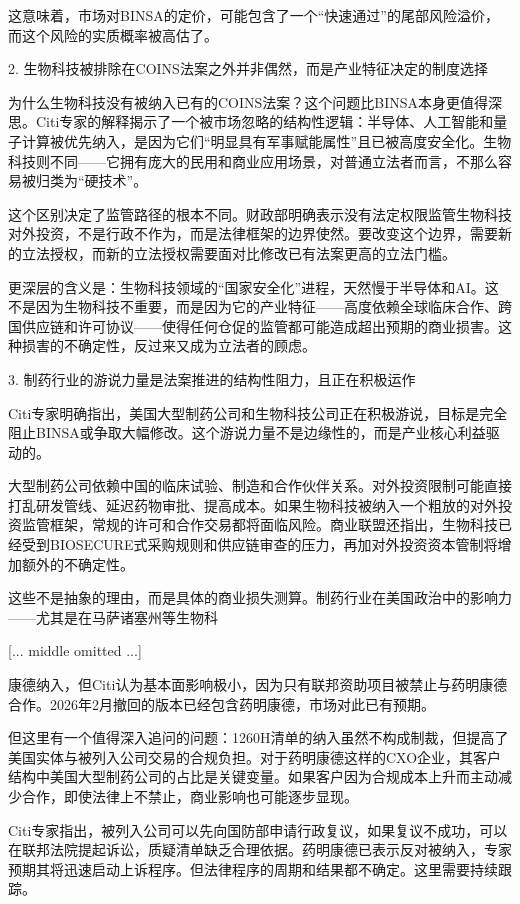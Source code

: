 \documentclass[11pt]{ctexart}
\begin{document}
这意味着，市场对BINSA的定价，可能包含了一个“快速通过”的尾部风险溢价，而这个风险的实质概率被高估了。

2. 生物科技被排除在COINS法案之外并非偶然，而是产业特征决定的制度选择

为什么生物科技没有被纳入已有的COINS法案？这个问题比BINSA本身更值得深思。Citi专家的解释揭示了一个被市场忽略的结构性逻辑：半导体、人工智能和量子计算被优先纳入，是因为它们“明显具有军事赋能属性”且已被高度安全化。生物科技则不同——它拥有庞大的民用和商业应用场景，对普通立法者而言，不那么容易被归类为“硬技术”。

这个区别决定了监管路径的根本不同。财政部明确表示没有法定权限监管生物科技对外投资，不是行政不作为，而是法律框架的边界使然。要改变这个边界，需要新的立法授权，而新的立法授权需要面对比修改已有法案更高的立法门槛。

更深层的含义是：生物科技领域的“国家安全化”进程，天然慢于半导体和AI。这不是因为生物科技不重要，而是因为它的产业特征——高度依赖全球临床合作、跨国供应链和许可协议——使得任何仓促的监管都可能造成超出预期的商业损害。这种损害的不确定性，反过来又成为立法者的顾虑。

3. 制药行业的游说力量是法案推进的结构性阻力，且正在积极运作

Citi专家明确指出，美国大型制药公司和生物科技公司正在积极游说，目标是完全阻止BINSA或争取大幅修改。这个游说力量不是边缘性的，而是产业核心利益驱动的。

大型制药公司依赖中国的临床试验、制造和合作伙伴关系。对外投资限制可能直接打乱研发管线、延迟药物审批、提高成本。如果生物科技被纳入一个粗放的对外投资监管框架，常规的许可和合作交易都将面临风险。商业联盟还指出，生物科技已经受到BIOSECURE式采购规则和供应链审查的压力，再加对外投资资本管制将增加额外的不确定性。

这些不是抽象的理由，而是具体的商业损失测算。制药行业在美国政治中的影响力——尤其是在马萨诸塞州等生物科

[... middle omitted ...]

康德纳入，但Citi认为基本面影响极小，因为只有联邦资助项目被禁止与药明康德合作。2026年2月撤回的版本已经包含药明康德，市场对此已有预期。

但这里有一个值得深入追问的问题：1260H清单的纳入虽然不构成制裁，但提高了美国实体与被列入公司交易的合规负担。对于药明康德这样的CXO企业，其客户结构中美国大型制药公司的占比是关键变量。如果客户因为合规成本上升而主动减少合作，即使法律上不禁止，商业影响也可能逐步显现。

Citi专家指出，被列入公司可以先向国防部申请行政复议，如果复议不成功，可以在联邦法院提起诉讼，质疑清单缺乏合理依据。药明康德已表示反对被纳入，专家预期其将迅速启动上诉程序。但法律程序的周期和结果都不确定。这里需要持续跟踪。
\end{document}
